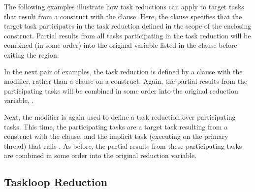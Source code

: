 
The following examples illustrate how task reductions can apply to target tasks
that result from a  construct with the 
clause. Here, the  clause specifies that the target task
participates in the task reduction defined in the scope of the enclosing
 construct. Partial results from all tasks participating in the
task reduction will be combined (in some order) into the original variable
listed in the  clause before exiting the 
region. 


\clearpage

In the next pair of examples, the task reduction is defined by a
 clause with the  modifier, rather than a
 clause on a  construct. Again, the
partial results from the participating tasks will be combined in some order
into the original reduction variable, .



Next, the  modifier is again used to define a task reduction over
participating tasks. This time, the participating tasks are a target task
resulting from a  construct with the  clause,
and the implicit task (executing on the primary thread) that calls
. As before, the partial results from these participating
tasks are combined in some order into the original reduction variable.




\subsection{Taskloop Reduction}
\label{subsec:taskloop_reduction}

